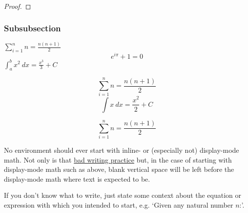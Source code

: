 \begin{proof}
    \lipsum[1]
\end{proof}

\begin{coro}
    \lipsum[][1-4]
\end{coro}

\subsubsection{Subsubsection}

\begin{defn}
    \lipsum[][1] \(\sum_{i=1}^{n} n = \frac{n(n+1)}{2}\) \lipsum[][2-3]
    \[e^{i\pi}+1 = 0\]
    \lipsum[][4] \(\int_{a}^{b} x^2 \ dx = \frac{x^3}{3} + C\) \lipsum[][5-6]
\end{defn}

\begin{nota}
    \lipsum[][1-3]
    \[\sum_{i=1}^{n} n = \frac{n(n+1)}{2}\]
    \lipsum[][4-5]
    \[\int x \ dx = \frac{x^2}{2} + C\]
    \lipsum[][6-7]
\end{nota}

\begin{defn}
    \[\sum_{i=1}^{n} n = \frac{n(n+1)}{2}\]
    \lipsum[][3-5]
\end{defn}

\begin{rmrk}
    No environment should ever start with inline- or (especially not) display-mode math. Not only is that \href{https://kconrad.math.uconn.edu/blurbs/proofs/writingtips.pdf}{bad writing practice} but, in the case of starting with display-mode math such as above, blank vertical space will be left before the display-mode math where text is expected to be.

    If you don't know what to write, just state some context about the equation or expression with which you intended to start, e.g. `Given any natural number \(n\):'.
\end{rmrk}

